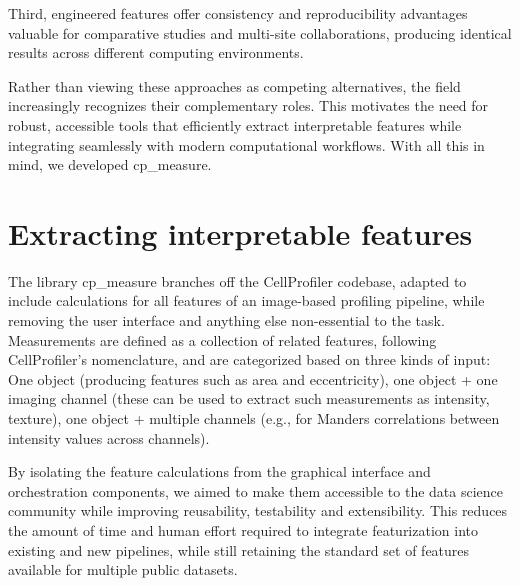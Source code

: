 \documentclass{article}
\begin{document}
Third, engineered features offer consistency and reproducibility advantages valuable for comparative studies and multi-site collaborations, producing identical results across different computing environments.

Rather than viewing these approaches as competing alternatives, the field increasingly recognizes their complementary roles. 
This motivates the need for robust, accessible tools that efficiently extract interpretable features while integrating seamlessly with modern computational workflows.
With all this in mind, we developed cp\_measure.


\section{Extracting interpretable features}
\label{sec:org61842b5}
The library cp\_measure branches off the CellProfiler codebase, adapted to include calculations for all features of an image-based profiling pipeline, while removing the user interface and anything else non-essential to the task. Measurements are defined as a collection of related features, following CellProfiler's nomenclature, and are categorized based on three kinds of input: One object (producing features such as area and eccentricity), one object + one imaging channel (these can be used to extract such measurements as intensity, texture), one object + multiple channels (e.g., for Manders correlations between intensity values across channels).

By isolating the feature calculations from the graphical interface and orchestration components, we aimed to make them accessible to the data science community while improving reusability, testability and extensibility. This reduces the amount of time and human effort required to integrate featurization into existing and new pipelines, while still retaining the standard set of features available for multiple public datasets.

\end{document}
